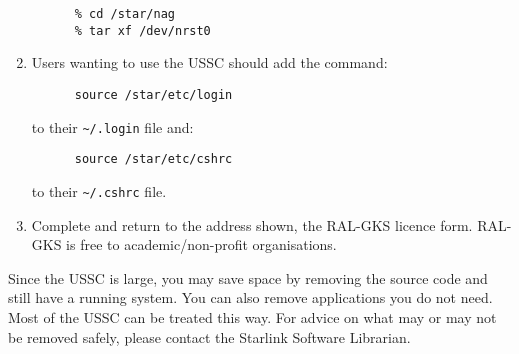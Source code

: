 \begin{enumerate}
\begin{verbatim}
      % cd /star/nag
      % tar xf /dev/nrst0
\end{verbatim}

\item Users wanting to use the USSC should add the command:
\begin{verbatim}
      source /star/etc/login
\end{verbatim}
to their \verb+~/.login+ file and:
\begin{verbatim}
      source /star/etc/cshrc
\end{verbatim}
to their \verb+~/.cshrc+ file.

\item Complete and return to the address shown, the RAL-GKS licence form.
RAL-GKS is free to academic/non-profit organisations.

\end{enumerate}

Since the USSC is large, you may save space by removing the source code 
and still have a running system. You can also remove applications you 
do not need. Most of the USSC can be treated this way. For advice on 
what may or may not be removed safely, please contact the Starlink 
Software Librarian.


